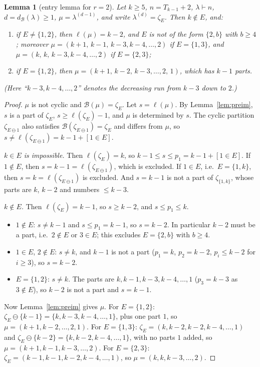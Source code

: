 \documentclass[11pt]{article}
\newtheorem{lemma}[theorem]{Lemma}
\theoremstyle{definition}
\newcommand{\B}{\mathcal{B}}
\newcommand{\dB}{d_{\mathcal{B}}}
\renewcommand{\le}{\leqslant}
\renewcommand{\ge}{\geqslant}
\begin{document}
\begin{lemma}[entry lemma for $r=2$]\label{lem:entry2}
Let $k\ge5$, $n=T_{k-1}+2$, $\lambda\vdash n$, $d=\dB(\lambda)\ge1$, $\mu=\lambda^{(d-1)}$, and write $\lambda^{(d)}=\zeta_E$.  Then
$k\notin E$, and:
\begin{enumerate}
\item[(a)] if $E\ne\{1,2\}$, then $\ell(\mu)=k-2$, and $E$ is not of the form $\{2,b\}$ with $b\ge4$; moreover
$\mu=(k+1,\,k-1,\,k-3,k-4,\dots,2)$ if $E=\{1,3\}$, and $\mu=(k,\,k,\,k-3,k-4,\dots,2)$ if $E=\{2,3\}$;
\item[(b)] if $E=\{1,2\}$, then $\mu=(k+1,\,k-2,\,k-3,\dots,2,\,1)$, which has $k-1$ parts.
\end{enumerate}
(Here ``$k-3,k-4,\dots,2$'' denotes the decreasing run from $k-3$ down to $2$.)
\end{lemma}
\begin{proof}
$\mu$ is not cyclic and $\B(\mu)=\zeta_E$.  Let $s=\ell(\mu)$.  By Lemma~\ref{lem:preim}, $s$ is a part of $\zeta_E$,
$s\ge\ell(\zeta_E)-1$, and $\mu$ is determined by $s$.  The cyclic partition $\zeta_{E\ominus1}$ also satisfies
$\B(\zeta_{E\ominus1})=\zeta_E$ and differs from $\mu$, so $s\ne\ell(\zeta_{E\ominus1})=k-1+[1\in E]$.

\emph{$k\in E$ is impossible.}  Then $\ell(\zeta_E)=k$, so $k-1\le s\le p_1=k-1+[1\in E]$.  If $1\notin E$, then
$s=k-1=\ell(\zeta_{E\ominus1})$, which is excluded.  If $1\in E$, i.e.\ $E=\{1,k\}$, then $s=k=\ell(\zeta_{E\ominus1})$ is excluded.
And $s=k-1$ is not a part of $\zeta_{\{1,k\}}$, whose parts are $k$, $k-2$ and numbers $\le k-3$.

\emph{$k\notin E$.}  Then $\ell(\zeta_E)=k-1$, so $s\ge k-2$, and $s\le p_1\le k$.
\begin{itemize}
\item $1\notin E$: $s\ne k-1$ and $s\le p_1=k-1$, so $s=k-2$.  In particular $k-2$ must be a part, i.e.\ $2\notin E$ or
$3\in E$; this excludes $E=\{2,b\}$ with $b\ge4$.
\item $1\in E$, $2\notin E$: $s\ne k$, and $k-1$ is not a part ($p_1=k$, $p_2=k-2$, $p_i\le k-2$ for $i\ge3$), so $s=k-2$.
\item $E=\{1,2\}$: $s\ne k$.  The parts are $k,k-1,k-3,k-4,\dots,1$ ($p_3=k-3$ as $3\notin E$), so $k-2$ is not a
part and $s=k-1$.
\end{itemize}
Now Lemma~\ref{lem:preim} gives $\mu$.  For $E=\{1,2\}$: $\zeta_E\ominus\{k-1\}=\{k,k-3,k-4,\dots,1\}$, plus one part $1$, so
$\mu=(k+1,k-2,\dots,2,1)$.  For $E=\{1,3\}$: $\zeta_E=(k,k-2,k-2,k-4,\dots,1)$ and
$\zeta_E\ominus\{k-2\}=\{k,k-2,k-4,\dots,1\}$, with no parts $1$ added, so $\mu=(k+1,k-1,k-3,\dots,2)$.  For $E=\{2,3\}$:
$\zeta_E=(k-1,k-1,k-2,k-4,\dots,1)$, so $\mu=(k,k,k-3,\dots,2)$.
\end{proof}
\end{document}
